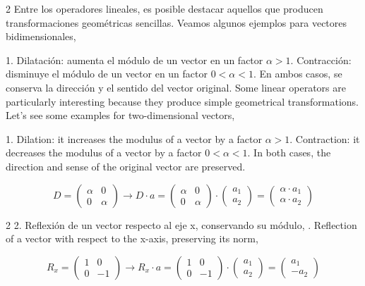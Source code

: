 \begin{paracol}{2}
Entre los operadores lineales, es posible destacar aquellos que producen transformaciones geométricas sencillas. Veamos algunos ejemplos para vectores bidimensionales,

1. Dilatación: aumenta el módulo de un vector en un factor $\alpha>1$. Contracción: disminuye el módulo de un vector en un factor $0<\alpha<1$. En ambos casos, se conserva la dirección y el sentido del vector original.
\switchcolumn
Some linear operators are particularly interesting because they produce simple geometrical transformations. Let's see some examples for two-dimensional vectors,

1. Dilation: it increases the modulus of a vector by a factor $\alpha>1$. Contraction: it decreases the modulus of a vector by a factor $0<\alpha<1$. In both cases, the direction and sense of the original vector are preserved.
\end{paracol} 
\begin{equation*}
D=\begin{pmatrix}
\alpha& 0\\
0& \alpha
\end{pmatrix} \rightarrow D\cdot a = \begin{pmatrix}
\alpha& 0\\
0& \alpha
\end{pmatrix} \cdot \begin{pmatrix}
a_1\\
a_2
\end{pmatrix}= \begin{pmatrix}
\alpha \cdot a_1\\
\alpha \cdot a_2
\end{pmatrix}
\end{equation*}
\begin{paracol}{2}
2. Reflexión de un vector respecto al eje x, conservando su módulo,
. Reflection of a vector with respect to the x-axis, preserving its norm,
\end{paracol}
\begin{equation*}
R_x=\begin{pmatrix}
1& 0\\
0& -1
\end{pmatrix} \rightarrow R_x\cdot a = \begin{pmatrix}
1& 0\\
0& -1
\end{pmatrix} \cdot \begin{pmatrix}
a_1\\
a_2
\end{pmatrix}= \begin{pmatrix}
a_1\\
-a_2
\end{pmatrix}
\end{equation*}
